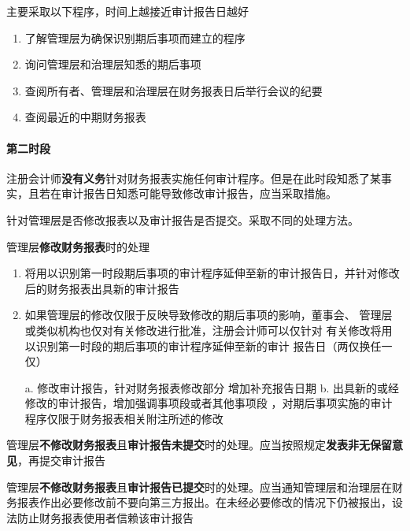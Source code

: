 \documentclass[UTF8,12pt]{ctexart}
\numberwithin{equation}{section} %
\numberwithin{figure}{section}
\numberwithin{table}{section}
\begin{document}
	主要采取以下程序，时间上越接近审计报告日越好
	\begin{enumerate}
		\item 了解管理层为确保识别期后事项而建立的程序
		
		\item 询问管理层和治理层知悉的期后事项
		
		\item 查阅所有者、管理层和治理层在财务报表日后举行会议的纪要
		
		\item 查阅最近的中期财务报表
	\end{enumerate}
	
	\paragraph{第二时段}
	注册会计师\textbf{没有义务}针对财务报表实施任何审计程序。但是在此时段知悉了某事实，且若在审计报告日知悉可能导致修改审计报告，应当采取措施。
	
	针对管理层是否修改报表以及审计报告是否提交。采取不同的处理方法。
	
	管理层\textbf{修改财务报表}时的处理
	\begin{enumerate}
		\item 将用以识别第一时段期后事项的审计程序延伸至新的审计报告日，并针对修改后的财务报表出具新的审计报告
		
		\item 如果管理层的修改仅限于反映导致修改的期后事项的影响，董事会、 管理层或类似机构也仅对有关修改进行批准，注册会计师可以仅针对 有关修改将用以识别第一时段的期后事项的审计程序延伸至新的审计 报告日（两仅换任一仅）
		
		a.  修改审计报告，针对财务报表修改部分  增加补充报告日期
		b. 出具新的或经修改的审计报告，增加强调事项段或者其他事项段 ，对期后事项实施的审计程序仅限于财务报表相关附注所述的修改
		
	\end{enumerate}
	
	管理层\textbf{不修改财务报表}且\textbf{审计报告未提交}时的处理。应当按照规定\textbf{发表非无保留意见}，再提交审计报告
	
	管理层\textbf{不修改财务报表}且\textbf{审计报告已提交}时的处理。应当通知管理层和治理层在财务报表作出必要修改前不要向第三方报出。在未经必要修改的情况下仍被报出，设法防止财务报表使用者信赖该审计报告
	
	
\end{document}
